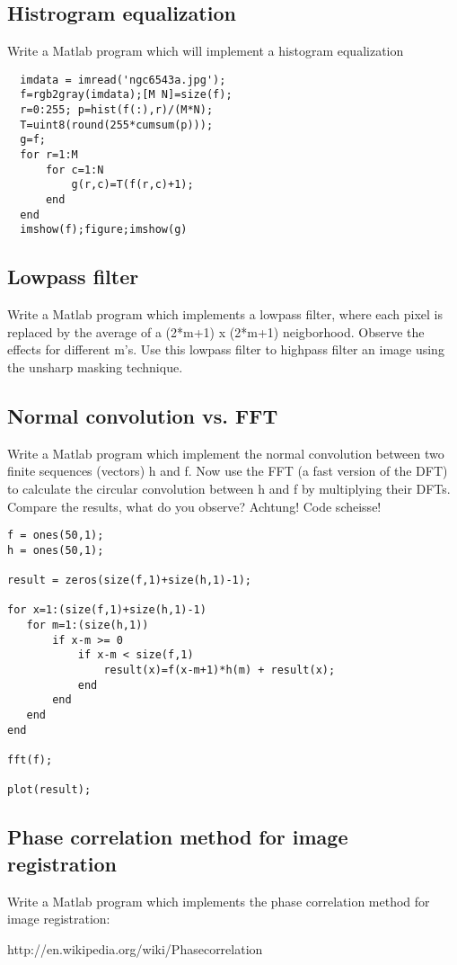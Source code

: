 \subsection{Histrogram equalization}
Write a Matlab program which will implement a histogram equalization
\begin{lstlisting}
  imdata = imread('ngc6543a.jpg');
  f=rgb2gray(imdata);[M N]=size(f);
  r=0:255; p=hist(f(:),r)/(M*N);
  T=uint8(round(255*cumsum(p)));
  g=f;
  for r=1:M
      for c=1:N
          g(r,c)=T(f(r,c)+1);
      end
  end
  imshow(f);figure;imshow(g)
\end{lstlisting}
\subsection{Lowpass filter}
Write a Matlab program which implements a lowpass filter, where each pixel is
replaced by the average of a (2*m+1) x (2*m+1) neigborhood. Observe the effects for different m's. Use this lowpass filter to highpass filter an image using the unsharp masking technique. 
\subsection{Normal convolution vs. FFT}
Write a Matlab program which implement the normal convolution between two finite
sequences (vectors) h and f. Now use the FFT (a fast version of the DFT) to calculate the circular convolution between h and f by multiplying their DFTs. Compare the results, what do you observe?
Achtung! Code scheisse!
\begin{lstlisting}
f = ones(50,1);
h = ones(50,1);

result = zeros(size(f,1)+size(h,1)-1);

for x=1:(size(f,1)+size(h,1)-1)
   for m=1:(size(h,1))
       if x-m >= 0
           if x-m < size(f,1)
               result(x)=f(x-m+1)*h(m) + result(x);
           end
       end
   end
end

fft(f);

plot(result);
\end{lstlisting}

\subsection{Phase correlation method for image registration}
Write a Matlab program which implements the phase correlation method for image
registration:

http://en.wikipedia.org/wiki/Phase\textunderscore correlation

